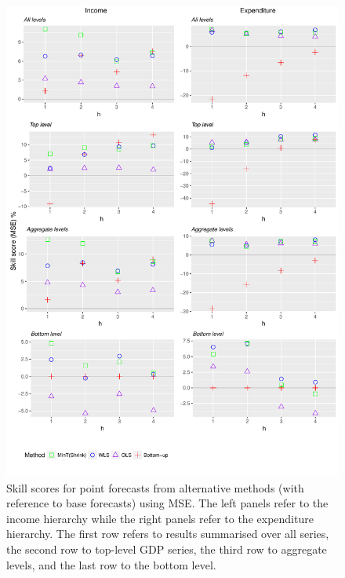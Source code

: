 \documentclass[graybox]{svmult}
\begin{document}
\begin{figure}
	\centering
	\small
	\includegraphics[width=\textwidth]{Figs/Results/PointF_MSE.pdf}
	\caption{Skill scores for point forecasts from alternative methods (with reference to base forecasts) using MSE\@. The left panels refer to the income hierarchy while the right panels refer to the expenditure hierarchy. The first row refers to results summarised over all series, the second row to top-level GDP series, the third row to aggregate levels, and the last row to the bottom level.}
	\label{fig: PointF_MSE}
\end{figure}
\end{document}
